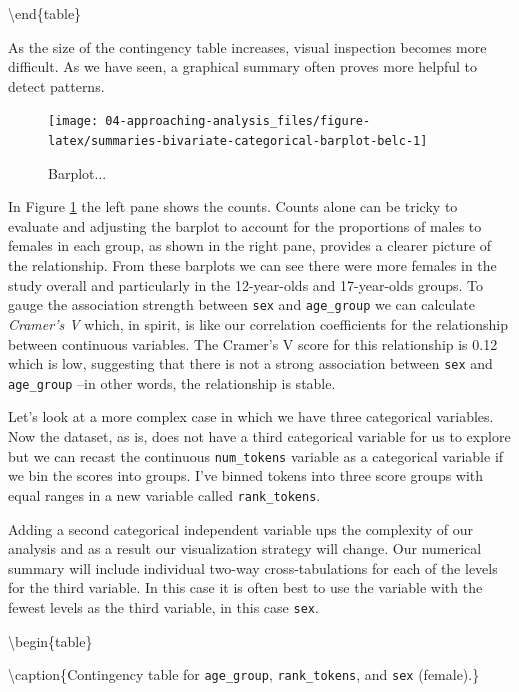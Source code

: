\documentclass[
]{article}
\begin{document}
\textbackslash end\{table\}

As the size of the contingency table increases, visual inspection becomes more difficult. As we have seen, a graphical summary often proves more helpful to detect patterns.

\begin{figure}

{\centering \texttt{[image: 04-approaching-analysis\_files/figure-latex/summaries-bivariate-categorical-barplot-belc-1]} 

}

\caption{Barplot...}\label{fig:summaries-bivariate-categorical-barplot-belc}
\end{figure}

In Figure \ref{fig:summaries-bivariate-categorical-barplot-belc} the left pane shows the counts. Counts alone can be tricky to evaluate and adjusting the barplot to account for the proportions of males to females in each group, as shown in the right pane, provides a clearer picture of the relationship. From these barplots we can see there were more females in the study overall and particularly in the 12-year-olds and 17-year-olds groups. To gauge the association strength between \texttt{sex} and \texttt{age\_group} we can calculate \emph{Cramer's V} which, in spirit, is like our correlation coefficients for the relationship between continuous variables. The Cramer's V score for this relationship is 0.12 which is low, suggesting that there is not a strong association between \texttt{sex} and \texttt{age\_group} --in other words, the relationship is stable.

Let's look at a more complex case in which we have three categorical variables. Now the dataset, as is, does not have a third categorical variable for us to explore but we can recast the continuous \texttt{num\_tokens} variable as a categorical variable if we bin the scores into groups. I've binned tokens into three score groups with equal ranges in a new variable called \texttt{rank\_tokens}.

Adding a second categorical independent variable ups the complexity of our analysis and as a result our visualization strategy will change. Our numerical summary will include individual two-way cross-tabulations for each of the levels for the third variable. In this case it is often best to use the variable with the fewest levels as the third variable, in this case \texttt{sex}.

\textbackslash begin\{table\}

\textbackslash caption\{\label{tab:summaries-multivariate-categorical-table-belc-female}Contingency table for \texttt{age\_group}, \texttt{rank\_tokens}, and \texttt{sex} (female).\}
\centering
\end{document}
